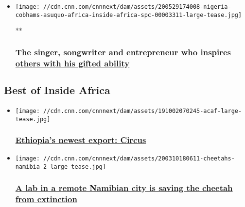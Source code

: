 \begin{itemize}
\item
  \href{/videos/world/2020/05/29/nigeria-cobhams-asuquo-africa-inside-africa-spc.cnn}{}

  \texttt{[image: //cdn.cnn.com/cnnnext/dam/assets/200529174008-nigeria-cobhams-asuquo-africa-inside-africa-spc-00003311-large-tease.jpg]}

  **

  \hypertarget{the-singer-songwriter-and-entrepreneur-who-inspires-others-with-his-gifted-ability}{%
  \subsubsection{\texorpdfstring{\href{/videos/world/2020/05/29/nigeria-cobhams-asuquo-africa-inside-africa-spc.cnn}{The
  singer, songwriter and entrepreneur who inspires others with his
  gifted
  ability}}{The singer, songwriter and entrepreneur who inspires others with his gifted ability}}\label{the-singer-songwriter-and-entrepreneur-who-inspires-others-with-his-gifted-ability}}
\end{itemize}

\hypertarget{best-of-inside-africa-}{%
\subsection{Best of Inside Africa~}\label{best-of-inside-africa-}}

\begin{itemize}
\item
  \href{/2019/10/03/africa/ethiopia-circus/index.html}{}

  \texttt{[image: //cdn.cnn.com/cnnnext/dam/assets/191002070245-acaf-large-tease.jpg]}

  \hypertarget{ethiopias-newest-export-circus}{%
  \subsubsection{\texorpdfstring{\href{/2019/10/03/africa/ethiopia-circus/index.html}{Ethiopia's
  newest export:
  Circus}}{Ethiopia's newest export: Circus}}\label{ethiopias-newest-export-circus}}
\end{itemize}

\begin{itemize}
\item
  \href{/2020/03/19/world/namibia-saving-cheetahs-extinction/index.html}{}

  \texttt{[image: //cdn.cnn.com/cnnnext/dam/assets/200310180611-cheetahs-namibia-2-large-tease.jpg]}

  \hypertarget{a-lab-in-a-remote-namibian-city-is-saving-the-cheetah-from-extinction}{%
  \subsubsection{\texorpdfstring{\href{/2020/03/19/world/namibia-saving-cheetahs-extinction/index.html}{A
  lab in a remote Namibian city is saving the cheetah from
  extinction}}{A lab in a remote Namibian city is saving the cheetah from extinction}}\label{a-lab-in-a-remote-namibian-city-is-saving-the-cheetah-from-extinction}}
\end{itemize}

